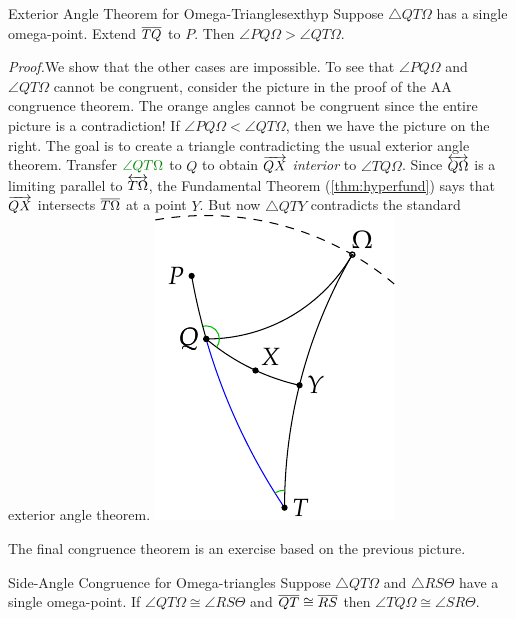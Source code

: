 \goodbreak


\begin{thm}{Exterior Angle Theorem for Omega-Triangles}{exthyp}
Suppose $\triangle QT\Omega$ has a single omega-point. Extend $\overline{TQ}$ to $P$. Then $\angle PQ\Omega>\angle QT\Omega$.
\end{thm}

\begin{tcolorbox}[proofstyle, lower separated=false, sidebyside, sidebyside align=top seam, sidebyside gap=0pt, righthand width=0.27\linewidth]
\emph{Proof.}\quad We show that the other cases are impossible.\medbreak
To see that $\angle PQ\Omega$ and $\angle QT\Omega$ cannot be congruent, consider the picture in the proof of the AA congruence theorem. The orange angles cannot be congruent since the entire picture is a contradiction!\medbreak
If $\angle PQ\Omega<\angle QT\Omega$, then we have the picture on the right. The goal is to create a triangle contradicting the usual exterior angle theorem.\smallbreak
Transfer $\textcolor{Green}{\angle QT\Omega}$ to $Q$ to obtain $\overrightarrow{QX}$ \emph{interior} to $\angle TQ\Omega$.\smallbreak
Since $\overleftrightarrow{Q\Omega}$ is a limiting parallel to $\overleftrightarrow{T\Omega}$, the Fundamental Theorem (\ref{thm:hyperfund}) says that $\overrightarrow{QX}$ intersects $\overline{T\Omega}$ at a point $Y$.\smallbreak
But now $\triangle QTY$ contradicts the standard exterior angle theorem.
\tcblower
\flushright\includegraphics{basic-ext4}\\\hfil\qedsymbol
\end{tcolorbox}

The final congruence theorem is an exercise based on the previous picture.

\begin{cor}{Side-Angle Congruence for Omega-triangles}{}
Suppose $\triangle QT\Omega$ and $\triangle RS\Theta$ have a single omega-point. If $\angle QT\Omega \cong\angle RS\Theta$ and $\overline{QT}\cong\overline{RS}$ then $\angle TQ\Omega \cong\angle SR\Theta$.
\end{cor}

